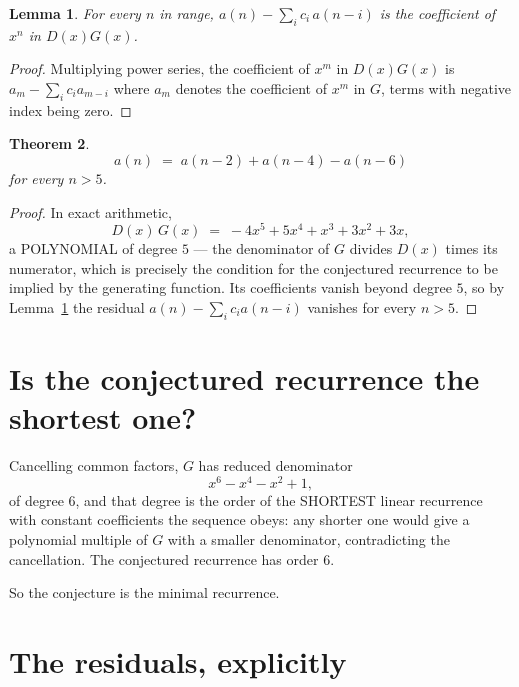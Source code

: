 \documentclass[11pt,a4paper]{article}
\theoremstyle{plain}
\newtheorem{theorem}{Theorem}
\newtheorem{lemma}[theorem]{Lemma}
\theoremstyle{definition}
\begin{document}
\begin{lemma}\label{lem:key}
For every $n$ in range, $a(n)-\sum_i c_i\,a(n-i)$ is the coefficient of $x^{n}$ in
$D(x)G(x)$.
\end{lemma}

\begin{proof}
Multiplying power series, the coefficient of $x^{m}$ in $D(x)G(x)$ is
$a_m-\sum_i c_i a_{m-i}$ where $a_m$ denotes the coefficient of $x^{m}$ in $G$, terms with
negative index being zero.
\end{proof}

\begin{theorem}
\[
a(n)\;=\;a(n-2) + a(n-4) - a(n-6)
\]
for every $n>5$.
\end{theorem}

\begin{proof}
In exact arithmetic,
\[
D(x)\,G(x)\;=\;- 4 x^{5} + 5 x^{4} + x^{3} + 3 x^{2} + 3 x,
\]
a POLYNOMIAL of degree $5$ --- the denominator of $G$ divides $D(x)$ times its numerator,
which is precisely the condition for the conjectured recurrence to be implied by the
generating function. Its coefficients vanish beyond degree $5$, so by
Lemma~\ref{lem:key} the residual $a(n)-\sum_ic_ia(n-i)$ vanishes for every
$n>5$.
\end{proof}

\section{Is the conjectured recurrence the shortest one?}

Cancelling common factors, $G$ has reduced denominator
\[
x^{6} - x^{4} - x^{2} + 1,
\]
of degree $6$, and that degree is the order of the SHORTEST linear recurrence with
constant coefficients the sequence obeys: any shorter one would give a polynomial multiple of
$G$ with a smaller denominator, contradicting the cancellation. The conjectured recurrence has
order $6$.

So the conjecture is the minimal recurrence.

\section{The residuals, explicitly}
\end{document}
